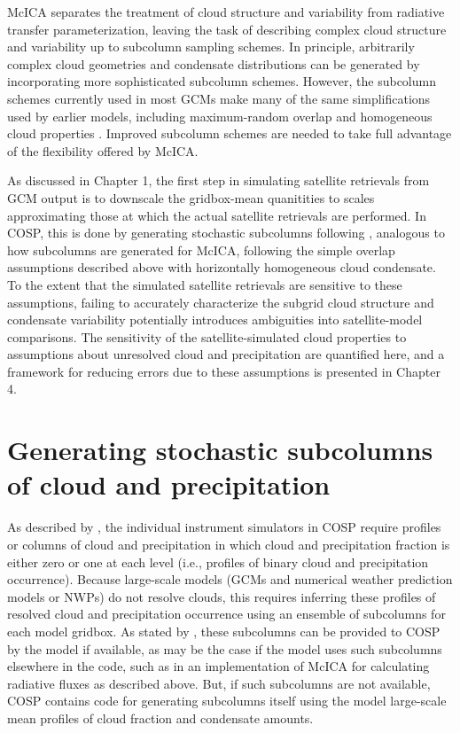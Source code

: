McICA separates the treatment of cloud structure and variability from
radiative transfer parameterization, leaving the task of describing
complex cloud structure and variability up to subcolumn sampling
schemes. In principle, arbitrarily complex cloud geometries and
condensate distributions can be generated by incorporating more
sophisticated subcolumn schemes. However, the subcolumn schemes
currently used in most GCMs make many of the same simplifications used
by earlier models, including maximum-random overlap and homogeneous
cloud properties \citep[e.g.,][]{neale_et_al_2010a, neale_et_al_2010b}.
Improved subcolumn schemes are needed to take full advantage of the
flexibility offered by McICA.

As discussed in Chapter 1, the first step in simulating satellite
retrievals from GCM output is to downscale the gridbox-mean quanitities
to scales approximating those at which the actual satellite retrievals
are performed. In COSP, this is done by generating stochastic subcolumns
following \citet{klein_and_jakob_1999}, analogous to how subcolumns are
generated for McICA, following the simple overlap assumptions described
above with horizontally homogeneous cloud condensate. To the extent that
the simulated satellite retrievals are sensitive to these assumptions,
failing to accurately characterize the subgrid cloud structure and
condensate variability potentially introduces ambiguities into
satellite-model comparisons. The sensitivity of the satellite-simulated
cloud properties to assumptions about unresolved cloud and precipitation
are quantified here, and a framework for reducing errors due to these
assumptions is presented in Chapter 4.

\section{Generating stochastic subcolumns of cloud and
precipitation}\label{sec:subgrid1Scops}

As described by \citet{bodas-salcedo_et_al_2011}, the individual
instrument simulators in COSP require profiles or columns of cloud and
precipitation in which cloud and precipitation fraction is either zero
or one at each level (i.e., profiles of binary cloud and precipitation
occurrence). Because large-scale models (GCMs and numerical weather
prediction models or NWPs) do not resolve clouds, this requires
inferring these profiles of resolved cloud and precipitation occurrence
using an ensemble of subcolumns for each model gridbox. As stated by
\citet{bodas-salcedo_et_al_2011}, these subcolumns can be provided to
COSP by the model if available, as may be the case if the model uses
such subcolumns elsewhere in the code, such as in an implementation of
McICA for calculating radiative fluxes as described above. But, if such
subcolumns are not available, COSP contains code for generating
subcolumns itself using the model large-scale mean profiles of cloud
fraction and condensate amounts.

